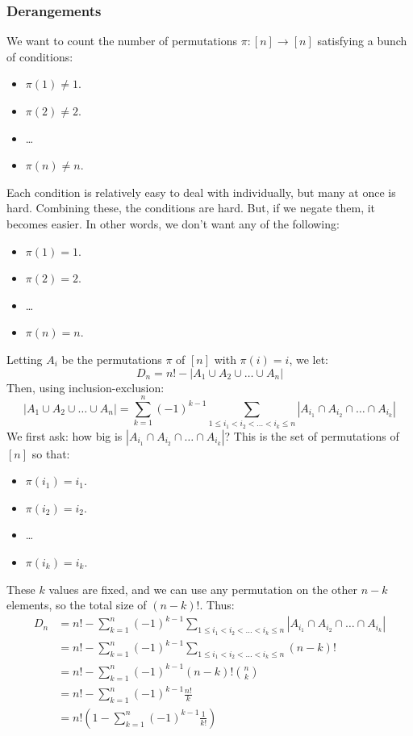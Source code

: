\documentclass[letterpaper]{article}
\begin{document}
\subsubsection{Derangements}
We want to count the number of permutations $\pi: [n] \to [n]$ satisfying a bunch of conditions:
\begin{itemize}
    \item $\pi(1) \neq 1$.
    \item $\pi(2) \neq 2$. 
    \item \dots
    \item $\pi(n) \neq n$. 
\end{itemize}
Each condition is relatively easy to deal with individually, but many at once is hard. Combining these, the conditions are hard. But, if we negate them, it becomes easier. In other words, we don't want any of the following:
\begin{itemize}
    \item $\pi(1) = 1$.
    \item $\pi(2) = 2$. 
    \item \dots
    \item $\pi(n) = n$. 
\end{itemize}
Letting $A_i$ be the permutations $\pi$ of $[n]$ with $\pi(i) = i$, we let:
\[D_n = n! - |A_1 \cup A_2 \cup \dots \cup A_n|\]
Then, using inclusion-exclusion:
\[|A_1 \cup A_2 \cup \dots \cup A_n| = \sum_{k = 1}^n (-1)^{k - 1} \sum_{1 \leq i_1 < i_2 < \dots < i_k \leq n} |A_{i_{1}} \cap A_{i_{2}} \cap \dots \cap A_{i_{k}}|\]
We first ask: how big is $|A_{i_1} \cap A_{i_2} \cap \dots \cap A_{i_k}|$? This is the set of permutations of $[n]$ so that:
\begin{itemize}
    \item $\pi(i_1) = i_1$.
    \item $\pi(i_2) = i_2$.
    \item \dots
    \item $\pi(i_k) = i_k$.
\end{itemize}
These $k$ values are fixed, and we can use any permutation on the other $n - k$ elements, so the total size of $(n - k)!$. Thus:
\begin{equation*}
    \begin{aligned}
        D_n &= n! - \sum_{k = 1}^n (-1)^{k - 1} \sum_{1 \leq i_1 < i_2 < \dots < i_k \leq n} |A_{i_{1}} \cap A_{i_{2}} \cap \dots \cap A_{i_{k}}| \\ 
            &= n! - \sum_{k = 1}^n (-1)^{k - 1} \sum_{1 \leq i_1 < i_2 < \dots < i_k \leq n} (n - k)! \\ 
            &= n! - \sum_{k = 1}^n (-1)^{k - 1} (n - k)! \binom{n}{k} \\ 
            &= n! - \sum_{k = 1}^n (-1)^{k - 1} \frac{n!}{k} \\ 
            &= n! \left(1 - \sum_{k = 1}^{n} (-1)^{k - 1} \frac{1}{k!}\right)
    \end{aligned}
\end{equation*}
\end{document}
